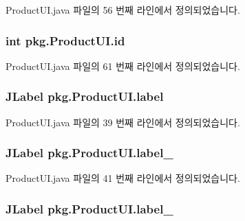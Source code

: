 Product\+U\+I.\+java 파일의 56 번째 라인에서 정의되었습니다.

\subsubsection[{\texorpdfstring{id}{id}}]{\setlength{\rightskip}{0pt plus 5cm}int pkg.\+Product\+U\+I.\+id\hspace{0.3cm}{\ttfamily [private]}}\hypertarget{classpkg_1_1_product_u_i_a1a30802c3dfbd189c88585ed515b78c9}{}\label{classpkg_1_1_product_u_i_a1a30802c3dfbd189c88585ed515b78c9}


Product\+U\+I.\+java 파일의 61 번째 라인에서 정의되었습니다.

\subsubsection[{\texorpdfstring{label}{label}}]{\setlength{\rightskip}{0pt plus 5cm}J\+Label pkg.\+Product\+U\+I.\+label\hspace{0.3cm}{\ttfamily [private]}}\hypertarget{classpkg_1_1_product_u_i_a0ef17a87fd778365f5e24e38081a1ea8}{}\label{classpkg_1_1_product_u_i_a0ef17a87fd778365f5e24e38081a1ea8}


Product\+U\+I.\+java 파일의 39 번째 라인에서 정의되었습니다.

\subsubsection[{\texorpdfstring{label\+\_\+1}{label_1}}]{\setlength{\rightskip}{0pt plus 5cm}J\+Label pkg.\+Product\+U\+I.\+label\+\_\hspace{0.3cm}{\ttfamily [private]}}\hypertarget{classpkg_1_1_product_u_i_a77b14da002223a885455d165ca197069}{}\label{classpkg_1_1_product_u_i_a77b14da002223a885455d165ca197069}


Product\+U\+I.\+java 파일의 41 번째 라인에서 정의되었습니다.

\subsubsection[{\texorpdfstring{label\+\_\+2}{label_2}}]{\setlength{\rightskip}{0pt plus 5cm}J\+Label pkg.\+Product\+U\+I.\+label\+\_\hspace{0.3cm}{\ttfamily [private]}}\hypertarget{classpkg_1_1_product_u_i_aa6f63b0826c3405cf68c4b8e68ca07ed}{}\label{classpkg_1_1_product_u_i_aa6f63b0826c3405cf68c4b8e68ca07ed}



